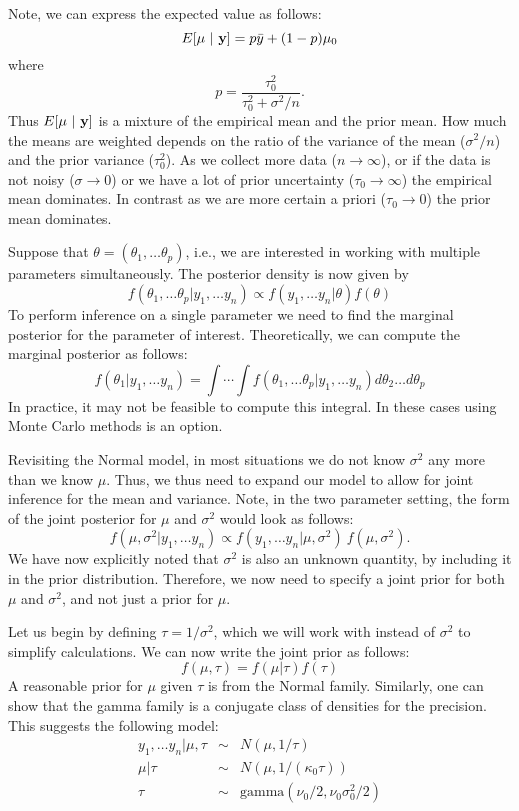 Note, we can express the expected value as follows:
$$
E[\mu ~|~ \mathbf{y}] = p \bar y + (1 - p) \mu_0
$$
where 
$$
p = \frac{\tau_0^2}{\tau_0^2 + \sigma^2 /n }.
$$
Thus $E[\mu ~|~ \mathbf{y}]$ is a mixture of the empirical mean and the prior mean. 
How much the means are weighted depends on the ratio of the variance of the mean ($\sigma^2/n$)
and the prior variance ($\tau_0^2$). 
As we collect more data ($n \rightarrow \infty$), or if the data is not noisy ($\sigma \rightarrow 0$) or we have a lot of prior uncertainty ($\tau_0 \rightarrow \infty$) the empirical mean dominates. 
In contrast as we are more certain a priori ($\tau_0 \rightarrow 0$) the prior mean dominates.

Suppose that $\theta = (\theta_1, \ldots \theta_p)$, i.e., we are interested in working with multiple parameters simultaneously.
The posterior density is now given by 
$$
f(\theta_1, \ldots \theta_p | y_1, \ldots y_n) \propto f(y_1, \ldots y_n | \theta) f(\theta)
$$
To perform inference on a single parameter we need to find the marginal posterior for the parameter of interest.
Theoretically, we can compute the marginal posterior as follows:
$$
f(\theta_1 | y_1, \ldots y_n) = \int \cdots \int {f(\theta_1, \ldots \theta_p | y_1, \ldots y_n) d\theta_2 \ldots d\theta_p}
$$
In practice, it may not be feasible to compute this integral.
In these cases using Monte Carlo methods is an option.

Revisiting the Normal model, in most situations we do not know $\sigma^2$ any more than we know $\mu$.
Thus, we thus need to expand our model to allow for joint inference for the mean and variance.
Note, in the two parameter setting, the form of the joint posterior for $\mu$ and $\sigma^2$ would look as follows:
$$
f(\mu, \sigma^2|  y_1, \ldots y_n) \propto f( y_1, \ldots y_n |\mu, \sigma^2)~ f(\mu, \sigma^2).
$$
We have now explicitly noted that $\sigma^2$ is also an unknown quantity, by including it in the prior distribution. 
Therefore, we now need to specify a joint prior for both $\mu$ and $\sigma^2$, and not just a prior for $\mu$. 

Let us begin by defining $\tau = 1/\sigma^2$, which we will work with instead of $\sigma^2$ to simplify calculations.
We can now write the joint prior as follows:
$$
f(\mu,\tau) =  f(\mu | \tau) f(\tau)   
$$
A reasonable prior for $\mu$ given $\tau$ is from the Normal family.
Similarly, one can show that the gamma family is a conjugate class of densities for the precision.
This suggests the following model:
\begin{eqnarray*}
y_1, \ldots y_n | \mu, \tau &\sim&  N(\mu , 1/\tau) \\
\mu| \tau  &\sim&  N(\mu , 1/(\kappa_0 \tau)) \\
\tau &\sim&  \mbox{gamma}(\nu_0/2 , \nu_0 \sigma^2_0/2) 
\end{eqnarray*}


